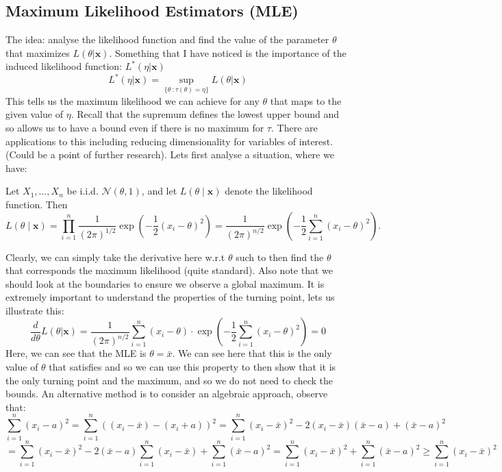 \documentclass[12pt]{article}
\begin{document}
\subsection{Maximum Likelihood Estimators (MLE)}
The idea: analyse the likelihood function and find the value of the parameter $\theta$ that maximizes $L(\theta| \mathbf{x})$. Something that I have noticed is the importance of the induced likelihood function: $L^*(\eta | \mathbf{x})$
\[L^*(\eta | \mathbf{x}) = \sup_{\{\theta\ : \tau(\theta) = \eta\}} L(\theta | \mathbf{x})\]
This tells us the maximum likelihood we can achieve for any $\theta$ that maps to the given value of $\eta$. Recall that the supremum defines the lowest upper bound and so allows us to have a bound even if there is no maximum for $\tau$. There are applications to this including reducing dimensionality for variables of interest. (Could be a point of further research). Lets first analyse a situation, where we have:\\
\begin{example}
Let \( X_1, \dots, X_n \) be i.i.d. \( \mathcal{N}(\theta, 1) \), and let \( L(\theta \mid \mathbf{x}) \) denote the likelihood function. Then
\[
L(\theta \mid \mathbf{x}) = \prod_{i=1}^n \frac{1}{(2\pi)^{1/2}} \exp\left(-\frac{1}{2}(x_i - \theta)^2\right)
= \frac{1}{(2\pi)^{n/2}} \exp\left(-\frac{1}{2} \sum_{i=1}^n (x_i - \theta)^2\right).
\]
\end{example}
Clearly, we can simply take the derivative here w.r.t $\theta$ such to then find the $\theta$ that corresponds the maximum likelihood (quite standard). Also note that we should look at the boundaries to ensure we observe a global maximum. It is extremely important to understand the properties of the turning point, lets us illustrate this:
\[\frac{d}{d\theta}L(\theta| \mathbf{x}) = \frac{1}{(2\pi)^{n/2}}\sum_{i=1}^n (x_i - \theta)\cdot \exp\left(-\frac{1}{2} \sum_{i=1}^n (x_i - \theta)^2\right) = 0\]
Here, we can see that the MLE is $\theta = \bar{x}$. We can see here that this is the only value of $\theta$ that satisfies and so we can use this property to then show that it is the only turning point and the maximum, and so we do not need to check the bounds. An alternative method is to consider an algebraic approach, observe that:
\[\sum_{i= 1}^{n}(x_i - a)^2 = \sum_{i= 1}^{n}((x_i - \bar{x}) - (x_i+a))^2 = \sum_{i= 1}^{n}(x_i -\bar{x})^2 -2(x_i - \bar{x})(\bar{x}-a) + (\bar{x}-a)^2\]
\[= \sum_{i= 1}^{n}(x_i -\bar{x})^2 -2(\bar{x}-a)\sum_{i= 1}^{n}(x_i - \bar{x}) + \sum_{i= 1}^{n}(\bar{x}-a)^2 = \sum_{i= 1}^{n}(x_i -\bar{x})^2 + \sum_{i= 1}^{n}(\bar{x}-a)^2 \geq \sum_{i= 1}^{n}(x_i -\bar{x})^2\] 
\end{document}
